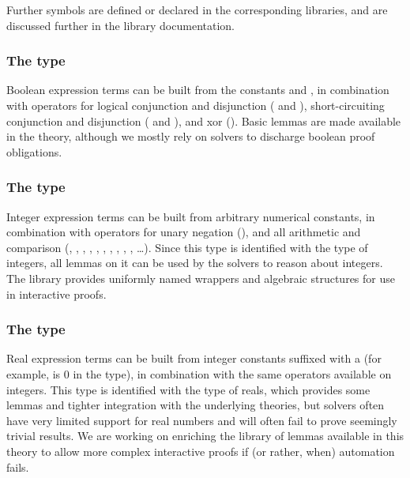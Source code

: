 Further symbols are defined or declared in the corresponding libraries, and are
discussed further in the library documentation.

\subsubsection*{The  type}
Boolean expression terms can be built from the constants
 and
, in combination
with operators for logical conjunction and disjunction
(\rawec{/\\} and
\rawec{\\\/}),
short-circuiting conjunction and disjunction
(\rawec{\&\&}
and
\rawec{||}),
and xor
(\rawec{\^\^}).
Basic lemmas are made available in the  theory, although we mostly
rely on \SMT solvers to discharge boolean proof obligations.

\subsubsection*{The  type}
Integer expression terms can be built from arbitrary numerical constants, in
combination with operators for unary negation (\rawec{-}), and all arithmetic
and comparison (\rawec{+}, \rawec{-}, \rawec{*}, \rawec{/}, \rawec{\%},
\rawec{^}, \rawec{=}, \rawec{<}, \rawec{<=}, \rawec{>}, \rawec{>=} \ldots).
Since this type is identified with the \WhyThree type of integers, all \WhyThree
lemmas on it can be used by the \SMT solvers to reason about integers. The
 library provides uniformly named wrappers and algebraic structures
for use in interactive proofs.

\subsubsection*{The  type}
Real expression terms can be built from integer constants suffixed with a
 (for example,  is 0 in the  type), in
combination with the same operators available on integers. This type is
identified with the \WhyThree type of reals, which provides some lemmas and
tighter integration with the underlying theories, but \SMT solvers often have
very limited support for real numbers and will often fail to prove seemingly
trivial results. We are working on enriching the library of lemmas available
in this theory to allow more complex interactive proofs if (or rather, when)
automation fails.

